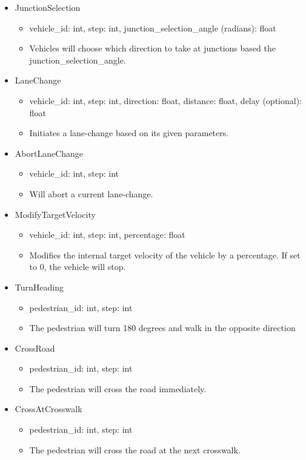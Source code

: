 \begin{itemize}
	\item JunctionSelection
	\begin{itemize}
		\item vehicle\_id: int, step: int, junction\_selection\_angle (radians): float
		\item Vehicles will choose which direction to take at junctions based the junction\_selection\_angle.
	\end{itemize}
	\item LaneChange
	\begin{itemize}
		\item vehicle\_id: int, step: int, direction: float, distance: float, delay (optional): float
		\item Initiates a lane-change based on its given parameters.
	\end{itemize}
	\item AbortLaneChange
	\begin{itemize}
		\item vehicle\_id: int, step: int
		\item Will abort a current lane-change.
	\end{itemize}
	\item ModifyTargetVelocity
	\begin{itemize}
		\item vehicle\_id: int, step: int, percentage: float
		\item Modifies the internal target velocity of the vehicle by a percentage. If set to 0, the vehicle will stop.
	\end{itemize}
	\item TurnHeading
	\begin{itemize}
		\item pedestrian\_id: int, step: int
		\item The pedestrian will turn 180 degrees and walk in the opposite direction
	\end{itemize}
	\item CrossRoad
	\begin{itemize}
		\item pedestrian\_id: int, step: int
		\item The pedestrian will cross the road immediately.
	\end{itemize}
	\item CrossAtCrosswalk
	\begin{itemize}
		\item pedestrian\_id: int, step: int
		\item The pedestrian will cross the road at the next crosswalk.
	\end{itemize}
\end{itemize}


